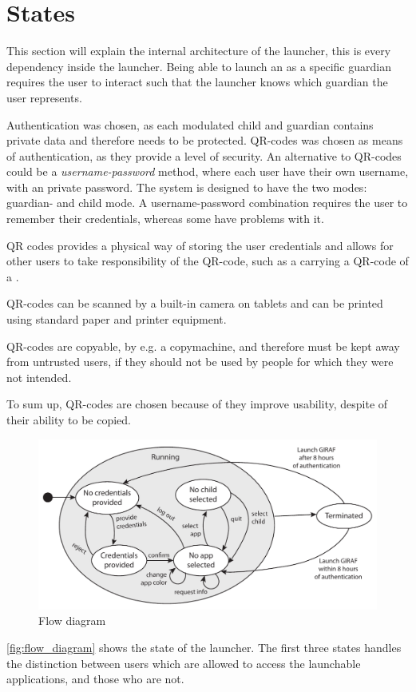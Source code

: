 \section{States}
This section will explain the internal architecture of the launcher, this is every dependency inside the launcher.
Being able to launch an \girafapp[] as a specific guardian requires the user to interact such that the launcher knows which guardian the user represents.

Authentication was chosen, as each modulated child and guardian contains private data and therefore needs to be protected. QR-codes was chosen as means of authentication, as they provide a level of security.
An alternative to QR-codes could be a \emph{username-password} method, where each user have their own username, with an private password. The system is designed to have the two modes: guardian- and child mode. A username-password combination requires the user to remember their credentials, whereas some \autists[] have problems with it. 

QR codes provides a physical way of storing the user credentials and allows for other users to take responsibility of the QR-code, such as a \guardian[] carrying a QR-code of a \autist[].

QR-codes can be scanned by a built-in camera on tablets and can be printed using standard paper and printer equipment. 

QR-codes are copyable, by e.g. a copymachine, and therefore must be kept away from untrusted users, if they should not be used by people for which they were not intended.

To sum up, QR-codes are chosen because of they improve usability, despite of their ability to be copied.



\begin{figure}[h]
	\centering
	\includegraphics[width=1\textwidth]{gfx/statediagram.pdf}
	\caption{Flow diagram}
	\label{fig:flow_diagram}
\end{figure}

\autoref{fig:flow_diagram} shows the state of the launcher. The first three states handles the distinction between users which are allowed to access the launchable applications, and those who are not. 

